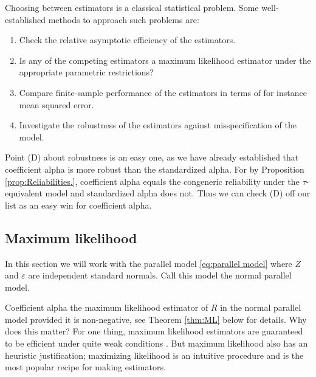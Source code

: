 \documentclass[twoside]{article}
\DeclareMathOperator{\Cor}{Cor}
\renewcommand{\sqrt}[1]{{(#1)^{1/2}}}
\begin{document}
Choosing between estimators is a classical statistical problem. Some well-established methods to approach such problems are:


\begin{enumerate}[label=(\Alph*)]
\item Check the relative asymptotic efficiency of the estimators.
\item Is any of the competing estimators a maximum likelihood estimator under the appropriate parametric restrictions?
\item Compare finite-sample performance of the estimators in terms of for instance mean squared error.
\item Investigate the robustness of the estimators against misspecification of the model.
\end{enumerate}

Point (D) about robustness is an easy one, as we have already established that coefficient alpha is more robust than the standardized alpha. For by Proposition \ref{prop:Reliabilities.}, coefficient alpha equals the congeneric reliability under the $\tau$-equivalent model and standardized alpha does not. Thus we can check (D) off our list as an easy win for coefficient alpha.

\subsection{Maximum likelihood}
In this section we will work with the parallel model \eqref{eq:parallel model} where $Z$ and $\varepsilon$ are independent standard normals. Call this model the normal parallel model.

Coefficient alpha the maximum likelihood estimator of $ R$ in the normal parallel model provided it is non-negative, see Theorem \ref{thm:ML} below for details. Why does this matter? For one thing, maximum likelihood estimators are guaranteed to be efficient under quite weak conditions \citep[][Section 7.3]{Lehmann2004-ke}. But maximum likelihood also has an heuristic justification; maximizing likelihood is an intuitive procedure and is the most popular recipe for making estimators.
\end{document}
